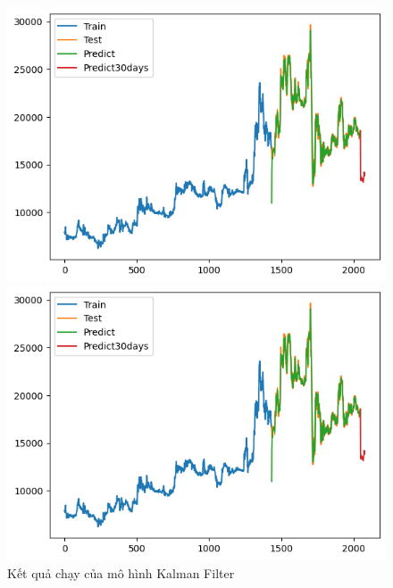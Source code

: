 \begin{figure}[H]
\begin{minipage}{0.15\textwidth}
    \includegraphics[width=1\textwidth]{resources/chapter-5/result/KF_EXIM_7_3.png}
    \end{minipage}
    \hfill
        \begin{minipage}{0.15\textwidth}
    \centering
    \includegraphics[width=1\textwidth]{resources/chapter-5/result/KF_EXIM_7_3.png}
    \end{minipage}
    \hfill
    
    \caption{Kết quả chạy của mô hình Kalman Filter}
    \label{fig:KalmanFilter}
\end{figure}

